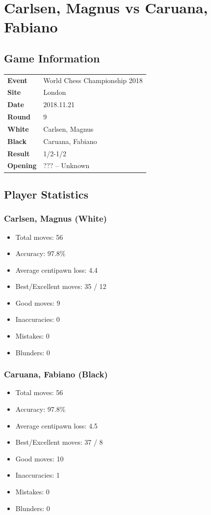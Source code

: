 \documentclass[11pt]{book}
\begin{document}
\chapter{Carlsen, Magnus vs Caruana, Fabiano}

\section{Game Information}
\begin{tabular}{ll}
\textbf{Event} & World Chess Championship 2018 \\
\textbf{Site} & London \\
\textbf{Date} & 2018.11.21 \\
\textbf{Round} & 9 \\
\textbf{White} & Carlsen, Magnus \\
\textbf{Black} & Caruana, Fabiano \\
\textbf{Result} & 1/2-1/2 \\
\textbf{Opening} & ??? -- Unknown \\
\end{tabular}

\section{Player Statistics}

\subsection{Carlsen, Magnus (White)}
\begin{itemize}
\item Total moves: 56
\item Accuracy: 97.8\%
\item Average centipawn loss: 4.4
\item Best/Excellent moves: 35 / 12
\item Good moves: 9
\item Inaccuracies: 0
\item Mistakes: 0
\item Blunders: 0
\end{itemize}

\subsection{Caruana, Fabiano (Black)}
\begin{itemize}
\item Total moves: 56
\item Accuracy: 97.8\%
\item Average centipawn loss: 4.5
\item Best/Excellent moves: 37 / 8
\item Good moves: 10
\item Inaccuracies: 1
\item Mistakes: 0
\item Blunders: 0
\end{itemize}
\end{document}
